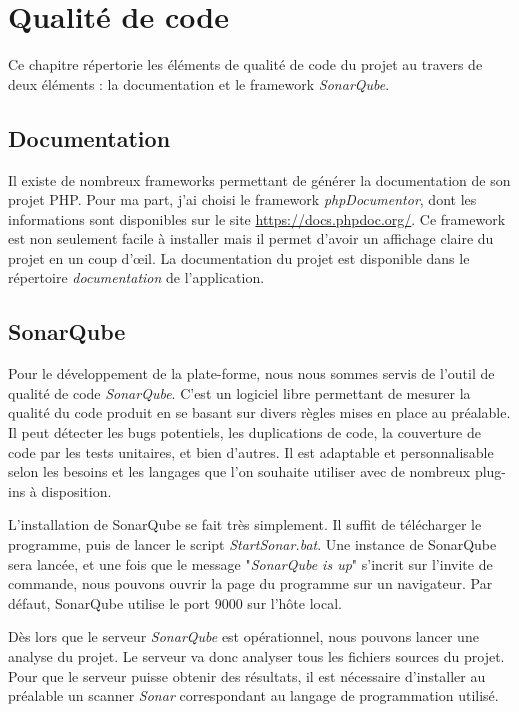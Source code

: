 \documentclass[noposter]{polytech/polytech}
\begin{document}
\chapter{Qualité de code}

Ce chapitre répertorie les éléments de qualité de code du projet au travers de deux éléments : la documentation et le framework \textit{SonarQube}.

\section{Documentation}

Il existe de nombreux frameworks permettant de générer la documentation de son projet PHP. Pour ma part, j'ai choisi le framework \textit{phpDocumentor}, dont les informations sont disponibles sur le site \url{https://docs.phpdoc.org/}. Ce framework est non seulement facile à installer mais il permet d'avoir un affichage claire du projet en un coup d'œil. La documentation du projet est disponible dans le répertoire \textit{documentation} de l'application.

\section{SonarQube}

Pour le développement de la plate-forme, nous nous sommes servis de 
l'outil de qualité de code \textit{SonarQube}. C'est un logiciel libre permettant de mesurer la qualité du code produit en se basant sur divers règles mises en place au préalable. Il peut détecter les bugs potentiels, les duplications de code, la couverture de code par les tests unitaires, et bien d'autres. Il est adaptable et personnalisable selon les besoins et les langages que l'on souhaite utiliser avec de nombreux plug-ins à disposition.

L'installation de SonarQube se fait très simplement. Il suffit de télécharger le programme, puis de lancer le script \textit{StartSonar.bat}. Une instance de SonarQube sera lancée, et une fois que le message "\textit{SonarQube is up}" s'incrit sur l'invite de commande, nous pouvons ouvrir la page du programme sur un navigateur. Par défaut, SonarQube utilise le port 9000 sur l'hôte local.

Dès lors que le serveur \textit{SonarQube} est opérationnel, nous pouvons lancer une analyse du projet. Le serveur va donc analyser tous les fichiers sources du projet. Pour que le serveur puisse obtenir des résultats, il est nécessaire d'installer au préalable un scanner \textit{Sonar} correspondant au langage de programmation utilisé.
\end{document}
